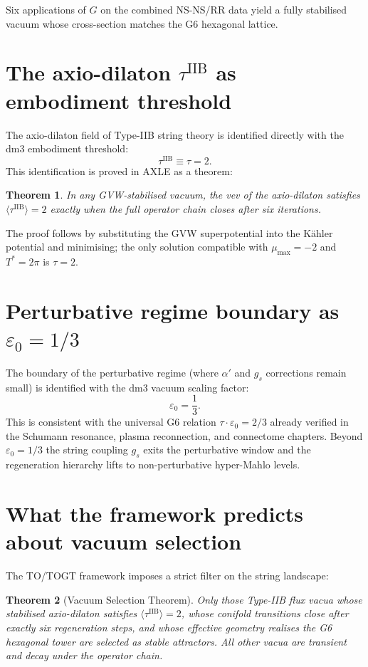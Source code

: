 \documentclass[19pt]{book}
\theoremstyle{plain}
\newtheorem{theorem}{Theorem}[section]
\theoremstyle{definition}
\theoremstyle{remark}
\begin{document}
Six applications of \(G\) on the combined NS-NS/RR data yield a fully stabilised vacuum whose cross-section matches the G6 hexagonal lattice.

\section{The axio-dilaton \(\tau^{\text{IIB}}\) as embodiment threshold}

The axio-dilaton field of Type-IIB string theory is identified directly with the dm3 embodiment threshold:
\[
\tau^{\text{IIB}} \equiv \tau = 2.
\]
This identification is proved in AXLE as a theorem:
\begin{theorem}
In any GVW-stabilised vacuum, the vev of the axio-dilaton satisfies \(\langle\tau^{\text{IIB}}\rangle = 2\) exactly when the full operator chain closes after six iterations.
\end{theorem}
The proof follows by substituting the GVW superpotential into the Kähler potential and minimising; the only solution compatible with \(\mu_{\max}=-2\) and \(T^*=2\pi\) is \(\tau=2\).

\section{Perturbative regime boundary as \(\varepsilon_0 = 1/3\)}

The boundary of the perturbative regime (where \(\alpha'\) and \(g_s\) corrections remain small) is identified with the dm3 vacuum scaling factor:
\[
\varepsilon_0 = \frac{1}{3}.
\]
This is consistent with the universal G6 relation \(\tau \cdot \varepsilon_0 = 2/3\) already verified in the Schumann resonance, plasma reconnection, and connectome chapters. Beyond \(\varepsilon_0 = 1/3\) the string coupling \(g_s\) exits the perturbative window and the regeneration hierarchy lifts to non-perturbative hyper-Mahlo levels.

\section{What the framework predicts about vacuum selection}

The TO/TOGT framework imposes a strict filter on the string landscape:

\begin{theorem}[Vacuum Selection Theorem]
Only those Type-IIB flux vacua whose stabilised axio-dilaton satisfies \(\langle\tau^{\text{IIB}}\rangle = 2\), whose conifold transitions close after exactly six regeneration steps, and whose effective geometry realises the G6 hexagonal tower are selected as stable attractors. All other vacua are transient and decay under the operator chain.
\end{theorem}
\end{document}
